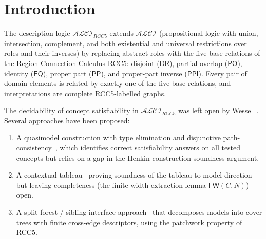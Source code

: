 \documentclass[a4paper,11pt]{article}
\theoremstyle{definition}
\newcommand{\ALCI}{\ensuremath{\mathcal{ALCI}}}
\newcommand{\ALCIRCC}[1]{\ensuremath{\mathcal{ALCI}_{\mathit{RCC#1}}}}
\newcommand{\DR}{\ensuremath{\mathsf{DR}}}
\newcommand{\PO}{\ensuremath{\mathsf{PO}}}
\newcommand{\EQ}{\ensuremath{\mathsf{EQ}}}
\newcommand{\PP}{\ensuremath{\mathsf{PP}}}
\newcommand{\PPI}{\ensuremath{\mathsf{PPI}}}
\begin{document}
\begin{abstract}
We present an implementation of a cover-tree tableau decision procedure
for concept satisfiability in $\ALCIRCC{5}$, the description logic
$\ALCI$ extended with the five jointly exhaustive and pairwise
disjoint RCC5 relations $\DR$, $\PO$, $\EQ$, $\PP$, $\PPI$ as
concrete roles, under strong $\EQ$ semantics.
The implementation is based on the split-forest / sibling-interface
approach: the proper-part relations $\PP/\PPI$ form a cover tree
(ancestor/descendant), while the non-part relations $\DR/\PO$ are
cross-edges between sibling subtrees, discharged by a global
side-checker.
The key insight---that $\PP$ is not an open sibling cross-edge
after $\EQ$-splitting---reduces the cross-edge problem to a
$\{\DR,\PO\}$ disjunctive network that is trivially arc-consistent.
We describe the algorithm, identify the critical checks that
distinguish this approach from a na\"{\i}ve quasimodel search
(composition propagation and restricted sibling
compatibility), and report on a cross-validation of 911~test
concepts against an independent reasoner, with zero mismatches.
\end{abstract}


\section{Introduction}
\label{sec:intro}

The description logic $\ALCIRCC{5}$ extends $\ALCI$ (propositional
logic with union, intersection, complement, and both existential and
universal restrictions over roles and their inverses) by replacing
abstract roles with the five base relations of the Region Connection
Calculus RCC5: disjoint ($\DR$), partial overlap ($\PO$), identity
($\EQ$), proper part ($\PP$), and proper-part inverse ($\PPI$).
Every pair of domain elements is related by exactly one of the five
base relations, and interpretations are complete RCC5-labelled graphs.

The decidability of concept satisfiability in $\ALCIRCC{5}$ was left
open by Wessel~\cite{Wessel2003,Wessel2002}.
Several approaches have been proposed:
\begin{enumerate}[label=(\roman*)]
  \item A quasimodel construction with type elimination and
    disjunctive path-consistency~\cite{ClaudeDecidability}, which
    identifies correct satisfiability answers on all tested concepts
    but relies on a gap in the Henkin-construction soundness argument.
  \item A contextual tableau~\cite{GPTContextual} proving soundness
    of the tableau-to-model direction but leaving completeness
    (the finite-width extraction lemma $\mathsf{FW}(C,N)$) open.
  \item A split-forest / sibling-interface
    approach~\cite{SiblingCompleted,CoverTree} that decomposes
    models into cover trees with finite cross-edge descriptors,
    using the patchwork property of RCC5.
\end{enumerate}
\end{document}

